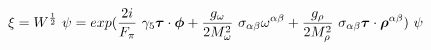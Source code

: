 \begin{equation}
\xi=W^{\frac{1}{2}}~\psi =exp(\frac{2i}{F_\pi}~\gamma_5 \mbox{\boldmath$\tau$} \cdot \mbox{\boldmath$\phi$} + \frac{g_\omega}{2M_\omega^2}~\sigma_{\alpha\beta} \omega^{\alpha\beta} +\frac{g_\rho}{2M_\rho^2}~\sigma_{\alpha\beta} \mbox{\boldmath$\tau$} \cdot \mbox{\boldmath$\rho$}^{\alpha\beta})~\psi
\end{equation} 

